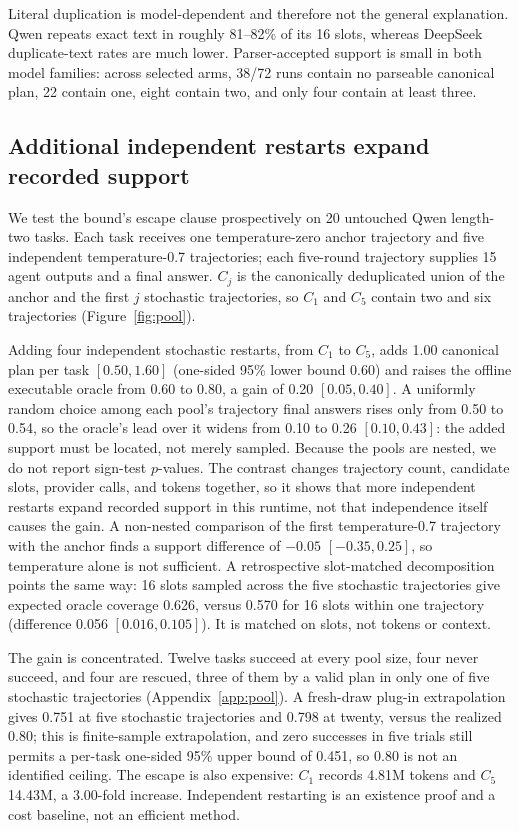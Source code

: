 \documentclass[11pt]{article}
\begin{document}
Literal duplication is model-dependent and therefore not the general explanation. Qwen repeats exact text in roughly 81--82\% of its 16 slots, whereas DeepSeek duplicate-text rates are much lower. Parser-accepted support is small in both model families: across selected arms, 38/72 runs contain no parseable canonical plan, 22 contain one, eight contain two, and only four contain at least three.

\subsection{Additional independent restarts expand recorded support}
\label{sec:res-expand}

We test the bound's escape clause prospectively on 20 untouched Qwen length-two tasks. Each task receives one temperature-zero anchor trajectory and five independent temperature-0.7 trajectories; each five-round trajectory supplies 15 agent outputs and a final answer. $C_j$ is the canonically deduplicated union of the anchor and the first $j$ stochastic trajectories, so $C_1$ and $C_5$ contain two and six trajectories (Figure~\ref{fig:pool}).

Adding four independent stochastic restarts, from $C_1$ to $C_5$, adds 1.00 canonical plan per task $[0.50,1.60]$ (one-sided 95\% lower bound 0.60) and raises the offline executable oracle from 0.60 to 0.80, a gain of 0.20 $[0.05,0.40]$. A uniformly random choice among each pool's trajectory final answers rises only from 0.50 to 0.54, so the oracle's lead over it widens from 0.10 to 0.26 $[0.10,0.43]$: the added support must be located, not merely sampled. Because the pools are nested, we do not report sign-test $p$-values. The contrast changes trajectory count, candidate slots, provider calls, and tokens together, so it shows that more independent restarts expand recorded support in this runtime, not that independence itself causes the gain. A non-nested comparison of the first temperature-0.7 trajectory with the anchor finds a support difference of $-0.05$ $[-0.35,0.25]$, so temperature alone is not sufficient. A retrospective slot-matched decomposition points the same way: 16 slots sampled across the five stochastic trajectories give expected oracle coverage 0.626, versus 0.570 for 16 slots within one trajectory (difference 0.056 $[0.016,0.105]$). It is matched on slots, not tokens or context.

The gain is concentrated. Twelve tasks succeed at every pool size, four never succeed, and four are rescued, three of them by a valid plan in only one of five stochastic trajectories (Appendix~\ref{app:pool}). A fresh-draw plug-in extrapolation gives 0.751 at five stochastic trajectories and 0.798 at twenty, versus the realized 0.80; this is finite-sample extrapolation, and zero successes in five trials still permits a per-task one-sided 95\% upper bound of 0.451, so 0.80 is not an identified ceiling. The escape is also expensive: $C_1$ records 4.81M tokens and $C_5$ 14.43M, a 3.00-fold increase. Independent restarting is an existence proof and a cost baseline, not an efficient method.
\end{document}
